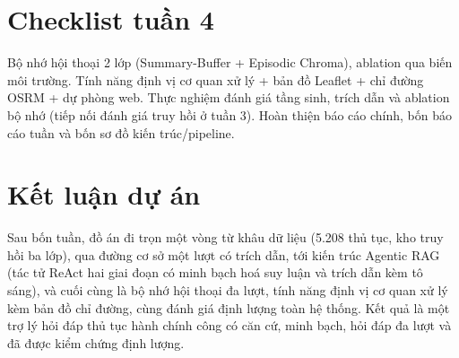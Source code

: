 \documentclass[11pt]{article}
\begin{document}
\section{Checklist tuần 4}
\begin{itemize}[label={}]
  \cbDone Bộ nhớ hội thoại 2 lớp (Summary-Buffer + Episodic Chroma), ablation qua biến môi trường.
  \cbDone Tính năng định vị cơ quan xử lý + bản đồ Leaflet + chỉ đường OSRM + dự phòng web.
  \cbDone Thực nghiệm đánh giá tầng sinh, trích dẫn và ablation bộ nhớ (tiếp nối đánh giá truy hồi ở tuần 3).
  \cbDone Hoàn thiện báo cáo chính, bốn báo cáo tuần và bốn sơ đồ kiến trúc/pipeline.
\end{itemize}

\section{Kết luận dự án}
Sau bốn tuần, đồ án đi trọn một vòng từ khâu dữ liệu (5.208 thủ tục, kho truy hồi ba lớp), qua
đường cơ sở một lượt có trích dẫn, tới kiến trúc Agentic RAG (tác tử ReAct hai giai đoạn có
minh bạch hoá suy luận và trích dẫn kèm tô sáng), và cuối cùng là bộ nhớ hội thoại đa lượt,
tính năng định vị cơ quan xử lý kèm bản đồ chỉ đường, cùng đánh giá định lượng toàn hệ thống.
Kết quả là một trợ lý hỏi đáp thủ tục hành chính công có căn cứ, minh bạch, hỏi đáp đa lượt và
đã được kiểm chứng định lượng.
\end{document}
